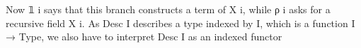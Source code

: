 Now 𝟙 i says that this branch constructs a term of X i, while ρ i asks for a recursive field X i. As Desc I describes a type indexed by I, which is a function I → Type, we also have to interpret Desc I as an indexed functor 
\begin{code}%
%
\>[2]\AgdaSpace{}%
\AgdaSymbol{:}\AgdaSpace{}%
\AgdaSpace{}%
\AgdaSpace{}%
\AgdaSpace{}%
\AgdaSymbol{(}\AgdaSpace{}%
\AgdaSpace{}%
\AgdaSymbol{)}\AgdaSpace{}%
\AgdaSpace{}%
\AgdaSymbol{(}\AgdaSpace{}%
\AgdaSpace{}%
\AgdaSymbol{)}\<%
\\
%
\>[2]\AgdaSpace{}%
\AgdaSpace{}%
%
\>[11]\AgdaSpace{}%
\AgdaSpace{}%
\AgdaSpace{}%
\AgdaSymbol{=}\AgdaSpace{}%
\AgdaSpace{}%
\AgdaSpace{}%
\<%
\\
%
\>[2]\AgdaSpace{}%
\AgdaSpace{}%
\AgdaSpace{}%
%
\>[11]\AgdaSpace{}%
\AgdaSpace{}%
\AgdaSpace{}%
\AgdaSymbol{=}\AgdaSpace{}%
\AgdaSpace{}%
\AgdaSpace{}%
\AgdaSpace{}%
\AgdaSpace{}%
\AgdaSpace{}%
\AgdaSpace{}%
\AgdaSpace{}%
\<%
\\
%
\>[2]\AgdaSpace{}%
\AgdaSpace{}%
\AgdaSpace{}%
%
\>[11]\AgdaSpace{}%
\AgdaSpace{}%
\AgdaSpace{}%
\AgdaSymbol{=}\AgdaSpace{}%
\AgdaFunction{Σ[}\AgdaSpace{}%
\AgdaSpace{}%
\AgdaSpace{}%
\AgdaSpace{}%
\AgdaFunction{]}\AgdaSpace{}%
\AgdaSpace{}%
\AgdaSpace{}%
\AgdaSpace{}%
\AgdaSpace{}%
\AgdaSpace{}%
\<%
\\
%
\>[2]\AgdaSpace{}%
\AgdaSpace{}%
\AgdaSpace{}%
%
\>[11]\AgdaSpace{}%
\AgdaSpace{}%
\AgdaSpace{}%
\AgdaSymbol{=}\AgdaSpace{}%
\AgdaSpace{}%
\AgdaSpace{}%
\AgdaSpace{}%
\AgdaSpace{}%
\AgdaSpace{}%
\AgdaSpace{}%
\AgdaSpace{}%
\AgdaSpace{}%
\AgdaSpace{}%
\AgdaSpace{}%
\<%
\end{code}

